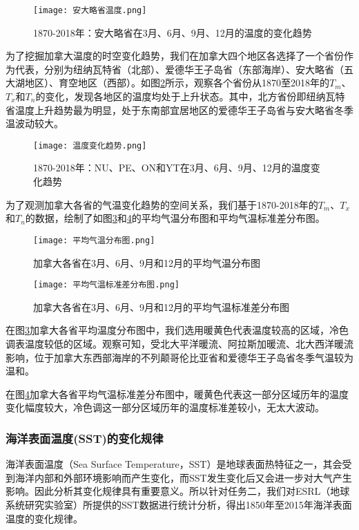 \documentclass[bwprint]{gmcmthesis}
\begin{document}
\begin{figure}[ht]
\centering
\texttt{[image: 安大略省温度.png]}
\caption{1870-2018年：安大略省在3月、6月、9月、12月的温度的变化趋势}\label{ON}
\end{figure}

为了挖掘加拿大温度的时空变化趋势，我们在加拿大四个地区各选择了一个省份作为代表，分别为纽纳瓦特省（北部）、爱德华王子岛省（东部海岸）、安大略省（五大湖地区）、育空地区（西部）。如图\ref{NU}所示，观察各个省份从1870至2018年的$T_m$、$T_x$和$T_n$的变化，发现各地区的温度均处于上升状态。其中，北方省份即纽纳瓦特省温度上升趋势最为明显，处于东南部宜居地区的爱德华王子岛省与安大略省冬季温波动较大。

\begin{figure}[ht]
\centering
\texttt{[image: 温度变化趋势.png]}
\caption{1870-2018年：NU、PE、ON和YT在3月、6月、9月、12月的温度变化趋势}\label{NU}
\end{figure}

为了观测加拿大各省的气温变化趋势的空间关系，我们基于1870-2018年的$T_m$、$T_x$和$T_n$的数据，绘制了如图\ref{ave}和\ref{std}的平均气温分布图和平均气温标准差分布图。

\begin{figure}[p]
\centering
\texttt{[image: 平均气温分布图.png]}
\caption{加拿大各省在3月、6月、9月和12月的平均气温分布图}\label{ave}
\end{figure}

\begin{figure}[p]
\centering
\texttt{[image: 平均气温标准差分布图.png]}
\caption{加拿大各省在3月、6月、9月和12月的平均气温标准差分布图}\label{std}
\end{figure}

在图\ref{ave}加拿大各省平均温度分布图中，我们选用暖黄色代表温度较高的区域，冷色调表温度较低的区域。观察可知，受北大平洋暖流、阿拉斯加暖流、北大西洋暖流影响，位于加拿大东西部海岸的不列颠哥伦比亚省和爱德华王子岛省冬季气温较为温和。

在图\ref{std}加拿大各省平均气温标准差分布图中，暖黄色代表这一部分区域历年的温度变化幅度较大，冷色调这一部分区域历年的温度标准差较小，无太大波动。

\subsubsection{海洋表面温度(SST)的变化规律}

海洋表面温度（Sea Surface Temperature，SST）是地球表面热特征之一，其会受到海洋内部和外部环境影响而产生变化，而SST发生变化后又会进一步对大气产生影响。因此分析其变化规律具有重要意义。所以针对任务二，我们对ESRL（地球系统研究实验室）所提供的SST数据进行统计分析，得出1850年至2015年海洋表面温度的变化规律。
\end{document}

